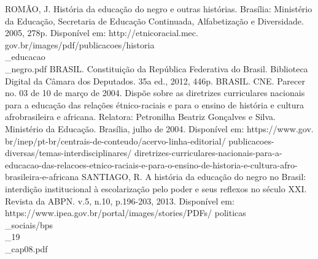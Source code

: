 {ROMÃO, J. História da educação do negro e outras histórias. Brasília: Ministério da Educação, Secretaria de Educação Continuada, Alfabetização
e Diversidade. 2005, 278p. Disponível em: http://etnicoracial.mec.
gov.br/images/pdf/publicacoes/historia\\_educacao\\_negro.pdf
\newline \newline 
BRASIL. Constituição da República Federativa do Brasil. Biblioteca Digital da Câmara dos Deputados. 35a ed., 2012, 446p.
\newline \newline 
BRASIL. CNE. Parecer no. 03 de 10 de março de 2004. Dispõe sobre as diretrizes curriculares nacionais para a educação das relações
étnico-raciais e para o ensino de história e cultura afrobrasileira e africana. Relatora: Petronilha Beatriz Gonçalves e Silva. Ministério da
Educação. Brasília, julho de 2004. Disponível em: https://www.gov.
br/inep/pt-br/centrais-de-conteudo/acervo-linha-editorial/
publicacoes-diversas/temas-interdisciplinares/
diretrizes-curriculares-nacionais-para-a-educacao-das-relacoes-etnico-raciais-e-para-o-ensino-de-historia-e-cultura-afro-brasileira-e-africana
\newline \newline 
SANTIAGO, R. A história da educação do negro no Brasil: interdição institucional à escolarização pelo poder e seus reflexos no século XXI. Revista da ABPN. v.5, n.10, p.196-203, 2013. Disponível em: https://www.ipea.gov.br/portal/images/stories/PDFs/
politicas\\_sociais/bps\\_19\\_cap08.pdf
}


